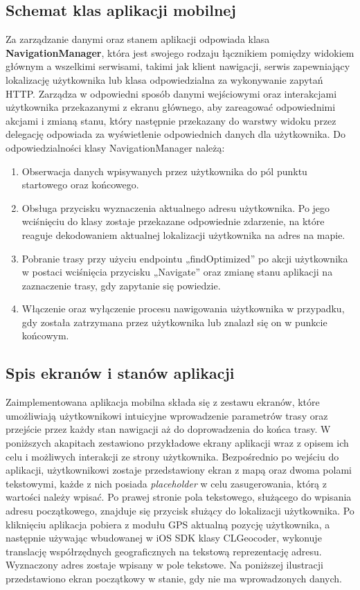\subsection{Schemat klas aplikacji mobilnej}

Za zarządzanie danymi oraz stanem aplikacji odpowiada klasa \textbf{NavigationManager}, która jest swojego rodzaju łącznikiem pomiędzy widokiem głównym a wszelkimi serwisami, takimi jak klient nawigacji, serwis zapewniający lokalizację użytkownika lub klasa odpowiedzialna za wykonywanie zapytań HTTP. Zarządza w odpowiedni sposób danymi wejściowymi oraz interakcjami użytkownika przekazanymi z ekranu głównego, aby zareagować odpowiednimi akcjami i zmianą stanu, który następnie przekazany do warstwy widoku przez delegację odpowiada za wyświetlenie odpowiednich danych dla użytkownika. Do odpowiedzialności klasy NavigationManager należą:

\begin{enumerate}
\item Obserwacja danych wpisywanych przez użytkownika do pól punktu startowego oraz końcowego.
\item Obsługa przycisku wyznaczenia aktualnego adresu użytkownika. Po jego wciśnięciu do klasy zostaje przekazane odpowiednie zdarzenie, na które reaguje dekodowaniem aktualnej lokalizacji użytkownika na adres na mapie.
\item Pobranie trasy przy użyciu endpointu „findOptimized” po akcji użytkownika w postaci wciśnięcia przycisku „Navigate” oraz zmianę stanu aplikacji na zaznaczenie trasy, gdy zapytanie się powiedzie.
\item Włączenie oraz wyłączenie procesu nawigowania użytkownika w przypadku, gdy została zatrzymana przez użytkownika lub znalazł się on w punkcie końcowym.
\end{enumerate}

\subsection{Spis ekranów i stanów aplikacji}

Zaimplementowana aplikacja mobilna składa się z zestawu ekranów, które umożliwiają użytkownikowi intuicyjne wprowadzenie parametrów trasy oraz przejście przez każdy stan nawigacji aż do doprowadzenia do końca trasy. W poniższych akapitach zestawiono przykładowe ekrany aplikacji wraz z opisem ich celu i możliwych interakcji ze strony użytkownika.
Bezpośrednio po wejściu do aplikacji, użytkownikowi zostaje przedstawiony ekran z mapą oraz dwoma polami tekstowymi, każde z nich posiada \textit{placeholder} w celu zasugerowania, którą z wartości należy wpisać. Po prawej stronie pola tekstowego, służącego do wpisania adresu początkowego, znajduje się przycisk służący do lokalizacji użytkownika. Po kliknięciu aplikacja pobiera z modułu GPS aktualną pozycję użytkownika, a następnie używając wbudowanej w iOS SDK klasy CLGeocoder, wykonuje translację współrzędnych geograficznych na tekstową reprezentację adresu. Wyznaczony adres zostaje wpisany w pole tekstowe. Na poniższej ilustracji przedstawiono ekran początkowy w stanie, gdy nie ma wprowadzonych danych.

